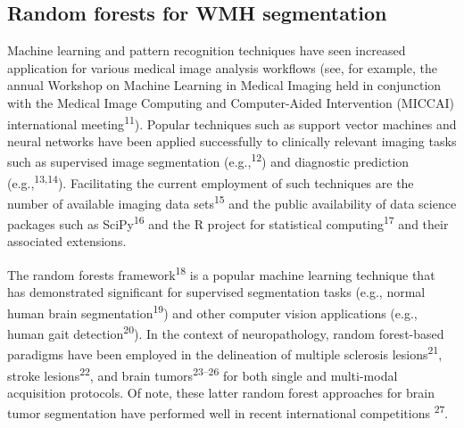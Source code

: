 \documentclass[11pt,]{article}
\begin{document}
\subsection{Random forests for WMH
segmentation}\label{random-forests-for-wmh-segmentation}

Machine learning and pattern recognition techniques have seen increased
application for various medical image analysis workflows (see, for
example, the annual Workshop on Machine Learning in Medical Imaging held
in conjunction with the Medical Image Computing and Computer-Aided
Intervention (MICCAI) international meeting\textsuperscript{11}).
Popular techniques such as support vector machines and neural networks
have been applied successfully to clinically relevant imaging tasks such
as supervised image segmentation (e.g.,\textsuperscript{12}) and
diagnostic prediction (e.g.,\textsuperscript{13,14}). Facilitating the
current employment of such techniques are the number of available
imaging data sets\textsuperscript{15} and the public availability of
data science packages such as SciPy\textsuperscript{16} and the R
project for statistical computing\textsuperscript{17} and their
associated extensions.

The random forests framework\textsuperscript{18} is a popular machine
learning technique that has demonstrated significant
 for supervised segmentation tasks
(e.g., normal human brain segmentation\textsuperscript{19}) and other
computer vision applications (e.g., human gait
detection\textsuperscript{20}). In the context of neuropathology, random
forest-based paradigms have been employed in the delineation of multiple
sclerosis lesions\textsuperscript{21}, stroke
lesions\textsuperscript{22}, and brain tumors\textsuperscript{23--26}
for both single and multi-modal acquisition protocols. Of note, these
latter random forest approaches for brain tumor segmentation have
performed well in recent international competitions
\textsuperscript{27}.
\end{document}
